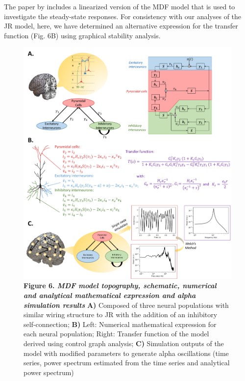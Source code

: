 \documentclass[12pt,twoside]{article}
\begin{document}
The paper by \citet{moran2007neural} includes a linearized version of the MDF model that is used to investigate the steady-state responses. For consistency with our analyses of the JR model, here, we have determined an alternative expression for the transfer function (Fig. 6B) using graphical stability analysis.
\begin{figure}[H]
    \centering
    \includegraphics[scale=0.45]{Images/Moran_schematic_4.png}
    \caption*{\textbf{Figure 6.  \textit{MDF model topography, schematic, numerical and analytical mathematical expression and alpha simulation results}} \textbf{A)} Composed of three neural populations with similar wiring structure to JR with the addition of an inhibitory self-connection; \textbf{B)} Left: Numerical mathematical expression for each neural population; Right: Transfer function of the model derived using control graph analysis; \textbf{C)} Simulation outputs of the model with modified parameters to generate alpha oscillations (time series, power spectrum estimated from the time series and analytical power spectrum)}    
    \label{fig:Mor_topography}
\end{figure}
\end{document}
